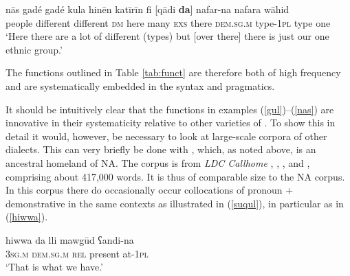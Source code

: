 \documentclass[output=paper]{langsci/langscibook}
\begin{document}
\ea\label{nas}
\gll nās gadé gadé kula hinēn katīrīn fi [qādi \textbf{da}] nafar-na nafara wāhid\\
     people different different \textsc{dm} here many \textsc{exs} there \textsc{dem.sg.m} type-\textsc{1pl} type one\\
\glt ‘Here there are a lot of different (types) but [over there] there is just our one ethnic group.’
\z

The functions outlined in Table \ref{tab:funct} are therefore both of high {frequency} and are systematically embedded in the syntax and pragmatics.

It should be intuitively clear that the functions in examples (\ref{gul})–(\ref{nas}) are innovative in their systematicity {relative} to other varieties of . To show this in detail it would, however, be necessary to look at large-scale corpora of other  dialects. This can very briefly be done with , which, as noted above, is an ancestral homeland of NA. The  corpus is from \textit{LDC Callhome} \citep{Canavanetal1997}, \citet{Nakano1982}, \citet{BehnstedtWoidich1987}, and \citet{WoidichDrop2007}, comprising about 417,000 words. It is thus of comparable size to the NA corpus. In this corpus there do occasionally occur collocations of pronoun + demonstrative in the same contexts as illustrated in (\ref{suqul}), in particular as in (\ref{hiwwa}).


\ea\label{hiwwa}
\gll hiwwa da lli mawgūd ʕandi-na\\
     \textsc{3sg.m} \textsc{dem.sg.m} \textsc{rel} present at-1\textsc{pl}\\
\glt ‘That is what we have.’
\z
\end{document}
